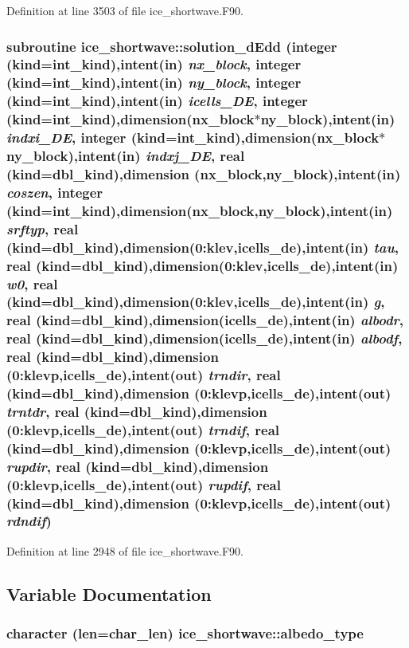 Definition at line 3503 of file ice\_\-shortwave.F90.\hypertarget{namespaceice__shortwave_a35b4eec6be9c5bc0bdb6a520b9f287d8}{
\subsubsection[{solution\_\-dEdd}]{\setlength{\rightskip}{0pt plus 5cm}subroutine ice\_\-shortwave::solution\_\-dEdd (integer (kind=int\_\-kind),intent(in) {\em nx\_\-block}, \/  integer (kind=int\_\-kind),intent(in) {\em ny\_\-block}, \/  integer (kind=int\_\-kind),intent(in) {\em icells\_\-DE}, \/  integer (kind=int\_\-kind),dimension(nx\_\-block$\ast$ny\_\-block),intent(in) {\em indxi\_\-DE}, \/  integer (kind=int\_\-kind),dimension(nx\_\-block$\ast$ny\_\-block),intent(in) {\em indxj\_\-DE}, \/  real (kind=dbl\_\-kind),dimension (nx\_\-block,ny\_\-block),intent(in) {\em coszen}, \/  integer (kind=int\_\-kind),dimension(nx\_\-block,ny\_\-block),intent(in) {\em srftyp}, \/  real (kind=dbl\_\-kind),dimension(0:klev,icells\_\-de),intent(in) {\em tau}, \/  real (kind=dbl\_\-kind),dimension(0:klev,icells\_\-de),intent(in) {\em w0}, \/  real (kind=dbl\_\-kind),dimension(0:klev,icells\_\-de),intent(in) {\em g}, \/  real (kind=dbl\_\-kind),dimension(icells\_\-de),intent(in) {\em albodr}, \/  real (kind=dbl\_\-kind),dimension(icells\_\-de),intent(in) {\em albodf}, \/  real (kind=dbl\_\-kind),dimension (0:klevp,icells\_\-de),intent(out) {\em trndir}, \/  real (kind=dbl\_\-kind),dimension (0:klevp,icells\_\-de),intent(out) {\em trntdr}, \/  real (kind=dbl\_\-kind),dimension (0:klevp,icells\_\-de),intent(out) {\em trndif}, \/  real (kind=dbl\_\-kind),dimension (0:klevp,icells\_\-de),intent(out) {\em rupdir}, \/  real (kind=dbl\_\-kind),dimension (0:klevp,icells\_\-de),intent(out) {\em rupdif}, \/  real (kind=dbl\_\-kind),dimension (0:klevp,icells\_\-de),intent(out) {\em rdndif})}}
\label{namespaceice__shortwave_a35b4eec6be9c5bc0bdb6a520b9f287d8}


Definition at line 2948 of file ice\_\-shortwave.F90.

\subsection{Variable Documentation}
\hypertarget{namespaceice__shortwave_a9943b1ef08bab4d7a0a1db2b653e0a18}{
\subsubsection[{albedo\_\-type}]{\setlength{\rightskip}{0pt plus 5cm}character (len=char\_\-len) {\bf ice\_\-shortwave::albedo\_\-type}}}
\label{namespaceice__shortwave_a9943b1ef08bab4d7a0a1db2b653e0a18}


